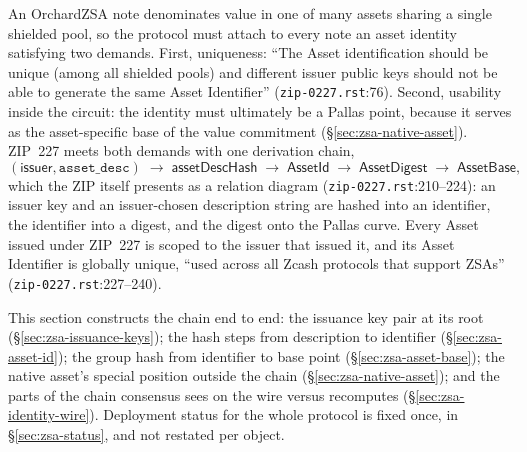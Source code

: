 \documentclass[11pt,a4paper]{article}
\theoremstyle{definition}
\begin{document}

An OrchardZSA note denominates value in one of many assets sharing a single
shielded pool, so the protocol must attach to every note an asset identity
satisfying two demands. First, uniqueness: ``The Asset identification should
be unique (among all shielded pools) and different issuer public keys should
not be able to generate the same Asset Identifier''
(\texttt{zip-0227.rst}:76). Second, usability inside the circuit: the
identity must ultimately be a Pallas point, because it serves as the
asset-specific base of the value commitment
(\S\ref{sec:zsa-native-asset}). ZIP~227 meets both demands with one
derivation chain,
\[
(\mathsf{issuer}, \texttt{asset\_desc})
\;\longrightarrow\; \mathsf{assetDescHash}
\;\longrightarrow\; \mathsf{AssetId}
\;\longrightarrow\; \mathsf{AssetDigest}
\;\longrightarrow\; \mathsf{AssetBase},
\]
which the ZIP itself presents as a relation diagram
(\texttt{zip-0227.rst}:210--224): an issuer key and an issuer-chosen
description string are hashed into an identifier, the identifier into a
digest, and the digest onto the Pallas curve. Every Asset issued under
ZIP~227 is scoped to the issuer that issued it, and its Asset Identifier is
globally unique, ``used across all Zcash protocols that support ZSAs''
(\texttt{zip-0227.rst}:227--240).

This section constructs the chain end to end: the issuance key pair at its
root (\S\ref{sec:zsa-issuance-keys}); the hash steps from description to
identifier (\S\ref{sec:zsa-asset-id}); the group hash from identifier to
base point (\S\ref{sec:zsa-asset-base}); the native asset's special position
outside the chain (\S\ref{sec:zsa-native-asset}); and the parts of the chain
consensus sees on the wire versus recomputes (\S\ref{sec:zsa-identity-wire}).
Deployment status for the whole protocol is fixed once, in
\S\ref{sec:zsa-status}, and not restated per object.
\end{document}

